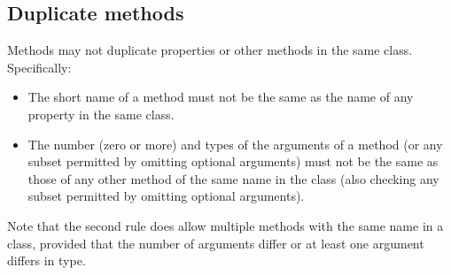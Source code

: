 \subsection{Duplicate methods}
 
Methods may not duplicate properties or other methods in the same class.
Specifically:
\begin{itemize}
\item 
The short name of a method must not be the same as the name of any
property in the same class.
\item 
The number (zero or more) and types of the arguments of a method (or any
subset permitted by omitting optional arguments) must not be the same as
those of any other method of the same name in the class (also checking
any subset permitted by omitting optional arguments).
\end{itemize}
Note that the second rule does allow multiple methods with the same
name in a class, provided that the number of arguments differ or
at least one argument differs in type.
